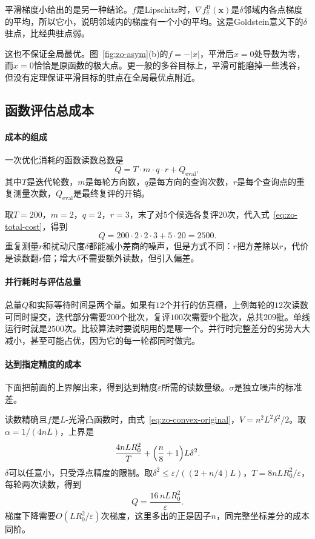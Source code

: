 平滑梯度小给出的是另一种结论。$f$是Lipschitz时，$\nabla f^{\mathrm{B}}_{\delta}(\bm{x})$是$\delta$邻域内各点梯度的平均，所以它小，说明邻域内的梯度有一个小的平均。这是Goldstein意义下的$\delta$驻点，比经典驻点弱。

这也不保证全局最优。图~\ref{fig:zo-asym}(b)的$f=-\lvert x\rvert$，平滑后$x=0$处导数为零，而$x=0$恰恰是原函数的极大点。更一般的多谷目标上，平滑可能磨掉一些浅谷，但没有定理保证平滑目标的驻点在全局最优点附近。

\subsection{函数评估总成本}
\label{sec:zo-total-cost}

\paragraph{成本的组成}
一次优化消耗的函数读数总数是
\begin{equation}
 Q=T\cdot m\cdot q\cdot r+Q_{\mathrm{eval}},
 \label{eq:zo-total-cost}
\end{equation}
其中$T$是迭代轮数，$m$是每轮方向数，$q$是每方向的查询次数，$r$是每个查询点的重复测量次数，$Q_{\mathrm{eval}}$是最终复评的开销。

取$T=200$，$m=2$，$q=2$，$r=3$，末了对$5$个候选各复评$20$次，代入式~\eqref{eq:zo-total-cost}，得到
\[
 Q=200\cdot2\cdot2\cdot3+5\cdot20=2500.
\]
重复测量$r$和扰动尺度$\delta$都能减小差商的噪声，但是方式不同：$r$把方差除以$r$，代价是读数翻$r$倍；增大$\delta$不需要额外读数，但引入偏差。

\paragraph{并行耗时与评估总量}
总量$Q$和实际等待时间是两个量。如果有$12$个并行的仿真槽，上例每轮的$12$次读数可同时提交，迭代部分需要$200$个批次，复评$100$次需要$9$个批次，总共$209$批。单线运行时就是$2500$次。比较算法时要说明用的是哪一个。并行时完整差分的劣势大大减小，甚至可能占优，因为它的每一轮都同时做完。

\paragraph{达到指定精度的成本}
下面把前面的上界解出来，得到达到精度$\varepsilon$所需的读数量级。$\sigma$是独立噪声的标准差。

读数精确且$f$是$L$-光滑凸函数时，由式~\eqref{eq:zo-convex-original}，$V=n^2L^2\delta^2/2$。取$\alpha=1/(4nL)$，上界是
\[
 \frac{4nLR_0^2}{T}+\Bigl(\frac{n}{8}+1\Bigr)L\delta^2.
\]
$\delta$可以任意小，只受浮点精度的限制。取$\delta^2\leq\varepsilon/((2+n/4)L)$，$T=8nLR_0^2/\varepsilon$，每轮两次读数，得到
\[
 Q=\frac{16\,nLR_0^2}{\varepsilon}.
\]
梯度下降需要$O(LR_0^2/\varepsilon)$次梯度，这里多出的正是因子$n$，同完整坐标差分的成本同阶。

